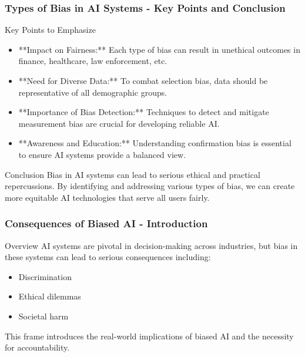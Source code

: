\documentclass[aspectratio=169]{beamer}
\begin{document}
\begin{frame}[fragile]
    \frametitle{Types of Bias in AI Systems - Key Points and Conclusion}
    \begin{block}{Key Points to Emphasize}
        \begin{itemize}
            \item **Impact on Fairness:** Each type of bias can result in unethical outcomes in finance, healthcare, law enforcement, etc.
            \item **Need for Diverse Data:** To combat selection bias, data should be representative of all demographic groups.
            \item **Importance of Bias Detection:** Techniques to detect and mitigate measurement bias are crucial for developing reliable AI.
            \item **Awareness and Education:** Understanding confirmation bias is essential to ensure AI systems provide a balanced view.
        \end{itemize}
    \end{block}

    \begin{block}{Conclusion}
        Bias in AI systems can lead to serious ethical and practical repercussions. By identifying and addressing various types of bias, we can create more equitable AI technologies that serve all users fairly.
    \end{block}
\end{frame}

\begin{frame}[fragile]
    \frametitle{Consequences of Biased AI - Introduction}
    \begin{block}{Overview}
        AI systems are pivotal in decision-making across industries, but bias in these systems can lead to serious consequences including:
        \begin{itemize}
            \item Discrimination
            \item Ethical dilemmas
            \item Societal harm
        \end{itemize}
        This frame introduces the real-world implications of biased AI and the necessity for accountability.
    \end{block}
\end{frame}
\end{document}
